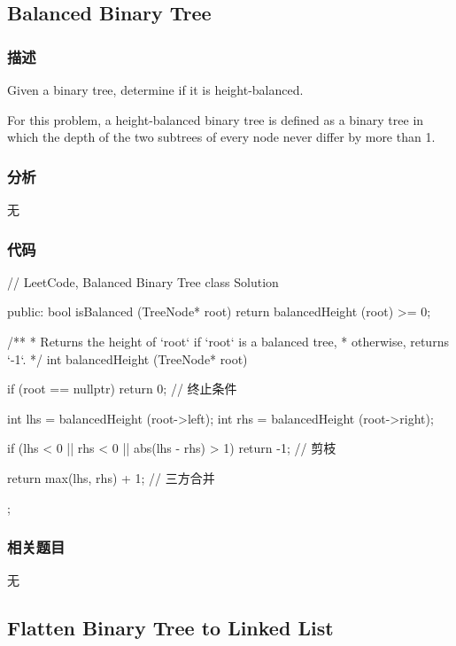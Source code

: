 \subsection{Balanced Binary Tree}
\label{sec:balanced-binary-tree}


\subsubsection{描述}
Given a binary tree, determine if it is height-balanced.

For this problem, a height-balanced binary tree is defined as a binary tree in which the depth of the two subtrees of every node never differ by more than 1.


\subsubsection{分析}
无


\subsubsection{代码}
\begin{Code}
// LeetCode, Balanced Binary Tree
class Solution {
public:
    bool isBalanced (TreeNode* root) {
        return balancedHeight (root) >= 0;
    }

    /**
     * Returns the height of `root` if `root` is a balanced tree,
     * otherwise, returns `-1`.
     */
    int balancedHeight (TreeNode* root) {
        if (root == nullptr) return 0;  // 终止条件

        int lhs = balancedHeight (root->left);
        int rhs = balancedHeight (root->right);

        if (lhs < 0 || rhs < 0 || abs(lhs - rhs) > 1) return -1;  // 剪枝

        return max(lhs, rhs) + 1; // 三方合并
    }
};
\end{Code}


\subsubsection{相关题目}
\begindot
\item 无
\myenddot


\subsection{Flatten Binary Tree to Linked List}
\label{sec:flatten-binary-tree-to-linked-list}


